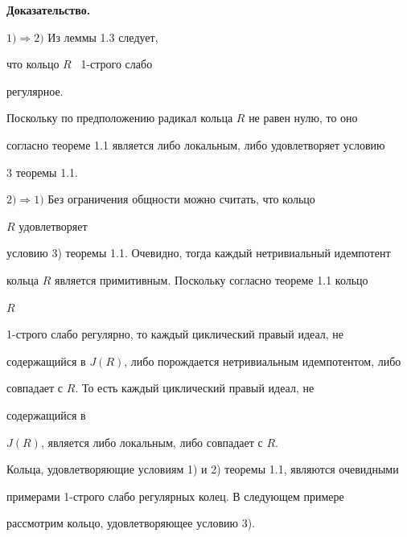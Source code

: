  


 


{\bf Доказательство.} 


$1)\Rightarrow 2)$ Из леммы 1.3 следует, 


что кольцо $R$ \ 1-строго слабо 


регулярное. 


Поскольку по предположению радикал кольца $R$ не равен нулю, то оно 


согласно теореме 1.1 является либо локальным, либо удовлетворяет условию 


3 теоремы 1.1. 


 


$2)\Rightarrow 1)$ Без ограничения общности можно считать, что кольцо 


$R$ удовлетворяет  


условию 3) теоремы 1.1. Очевидно, тогда каждый нетривиальный идемпотент  


кольца $R$ является примитивным. Поскольку согласно теореме 1.1 кольцо 


$R$ 


1-строго слабо регулярно, то каждый циклический правый идеал, не 


содержащийся в $J(R)$, либо порождается нетривиальным идемпотентом, либо  


совпадает с $R$. То есть каждый циклический правый идеал, не 


содержащийся в  


$J(R)$, является либо локальным, либо совпадает с $R$. 


\medskip 


 


Кольца, удовлетворяющие условиям 1) и 2) теоремы 1.1, являются очевидными 


примерами 1-строго слабо регулярных колец. В следующем примере  


рассмотрим кольцо, удовлетворяющее условию 3). 


 


